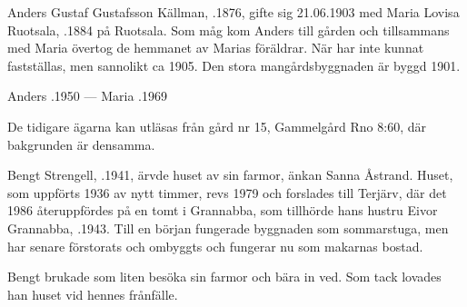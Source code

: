 %
Anders Gustaf Gustafsson Källman, .1876, gifte sig 21.06.1903 med Maria Lovisa Ruotsala, .1884 på Ruotsala. Som måg kom Anders till gården och tillsammans med Maria övertog de hemmanet av Marias föräldrar. När har inte kunnat fastställas, men sannolikt ca 1905. Den stora mangårdsbyggnaden är byggd 1901.
\begin{jhchildren}
  \item {}
  \item {}
  \item {}
  \item {}
  \item {}
  \item {}
  \item {}
\end{jhchildren}

Anders .1950  ---  Maria .1969

De tidigare ägarna kan utläsas från gård nr 15, Gammelgård Rno 8:60, där bakgrunden är densamma.


%


%
Bengt Strengell, .1941, ärvde huset av sin farmor, änkan Sanna Åstrand. Huset, som uppförts 1936 av nytt timmer, revs 1979 och forslades till Terjärv, där det 1986 återuppfördes på en tomt i Grannabba, som tillhörde hans hustru Eivor Grannabba, .1943. Till en början fungerade byggnaden som sommarstuga, men har senare förstorats och ombyggts och fungerar nu som makarnas bostad.

Bengt brukade som liten besöka sin farmor och bära in ved. Som tack lovades han huset vid hennes frånfälle.



